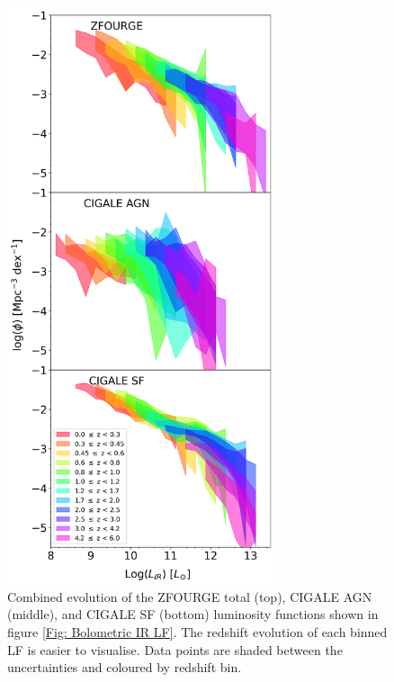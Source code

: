 \begin{figure}
    \centering
    \includegraphics[width=0.7\textwidth]{Figures/LF_Filled.png}
    \caption{Combined evolution of the ZFOURGE total (top), CIGALE AGN (middle), and CIGALE SF (bottom) luminosity functions shown in figure \ref{Fig: Bolometric IR LF}. The redshift evolution of each binned LF is easier to visualise. Data points are shaded between the uncertainties and coloured by redshift bin.}
    \label{Fig: LF Filled}
\end{figure}

